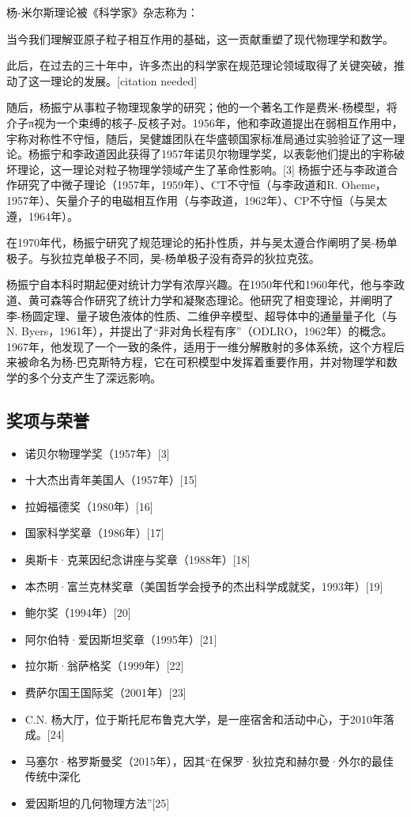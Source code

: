 杨-米尔斯理论被《科学家》杂志称为：

当今我们理解亚原子粒子相互作用的基础，这一贡献重塑了现代物理学和数学。

此后，在过去的三十年中，许多杰出的科学家在规范理论领域取得了关键突破，推动了这一理论的发展。[citation needed]

随后，杨振宁从事粒子物理现象学的研究；他的一个著名工作是费米-杨模型，将介子π视为一个束缚的核子-反核子对。1956年，他和李政道提出在弱相互作用中，宇称对称性不守恒，随后，吴健雄团队在华盛顿国家标准局通过实验验证了这一理论。杨振宁和李政道因此获得了1957年诺贝尔物理学奖，以表彰他们提出的宇称破坏理论，这一理论对粒子物理学领域产生了革命性影响。[3] 杨振宁还与李政道合作研究了中微子理论（1957年，1959年）、CT不守恒（与李政道和R. Oheme，1957年）、矢量介子的电磁相互作用（与李政道，1962年）、CP不守恒（与吴太遵，1964年）。

在1970年代，杨振宁研究了规范理论的拓扑性质，并与吴太遵合作阐明了吴-杨单极子。与狄拉克单极子不同，吴-杨单极子没有奇异的狄拉克弦。

杨振宁自本科时期起便对统计力学有浓厚兴趣。在1950年代和1960年代，他与李政道、黄可森等合作研究了统计力学和凝聚态理论。他研究了相变理论，并阐明了李-杨圆定理、量子玻色液体的性质、二维伊辛模型、超导体中的通量量子化（与N. Byers，1961年），并提出了“非对角长程有序”（ODLRO，1962年）的概念。1967年，他发现了一个一致的条件，适用于一维分解散射的多体系统，这个方程后来被命名为杨-巴克斯特方程，它在可积模型中发挥着重要作用，并对物理学和数学的多个分支产生了深远影响。
\subsection{奖项与荣誉}
\begin{itemize}
\item 诺贝尔物理学奖（1957年）[3]  
\item 十大杰出青年美国人（1957年）[15]  
\item 拉姆福德奖（1980年）[16]  
\item 国家科学奖章（1986年）[17]  
\item 奥斯卡·克莱因纪念讲座与奖章（1988年）[18]  
\item 本杰明·富兰克林奖章（美国哲学会授予的杰出科学成就奖，1993年）[19]  
\item 鲍尔奖（1994年）[20]  
\item 阿尔伯特·爱因斯坦奖章（1995年）[21]  
\item 拉尔斯·翁萨格奖（1999年）[22]  
\item 费萨尔国王国际奖（2001年）[23]  
\item C.N. 杨大厅，位于斯托尼布鲁克大学，是一座宿舍和活动中心，于2010年落成。[24]  
\item 马塞尔·格罗斯曼奖（2015年），因其“在保罗·狄拉克和赫尔曼·外尔的最佳传统中深化\item 爱因斯坦的几何物理方法”[25]
\end{itemize}
